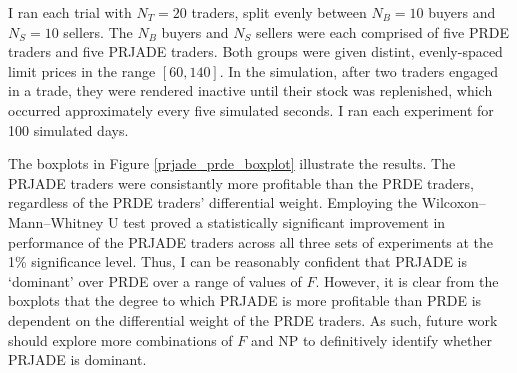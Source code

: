 \documentclass[conference]{IEEEtran}
\begin{document}
I ran each trial with $N_T=20$ traders, split evenly between $N_B=10$ buyers and $N_S=10$ sellers.
The $N_B$ buyers and $N_S$ sellers were each comprised of five PRDE traders and five PRJADE traders.
Both groups were given distint, evenly-spaced limit prices in the range $[60,140]$.
In the simulation, after two traders engaged in a trade, they were rendered inactive until their stock was replenished, which occurred approximately every five simulated seconds.
I ran each experiment for 100 simulated days.

The boxplots in Figure \ref{prjade_prde_boxplot} illustrate the results.
The PRJADE traders were consistantly more profitable than the PRDE traders, regardless of the PRDE traders' differential weight.
Employing the Wilcoxon--Mann--Whitney U test proved a statistically significant improvement in performance of the PRJADE traders across all three sets of experiments at the 1\% significance level.
Thus, I can be reasonably confident that PRJADE is `dominant' over PRDE over a range of values of $F$.
However, it is clear from the boxplots that the degree to which PRJADE is more profitable than PRDE is dependent on the differential weight of the PRDE traders.
As such, future work should explore more combinations of $F$ and $\mathrm{NP}$ to definitively identify whether PRJADE is dominant.
\end{document}
